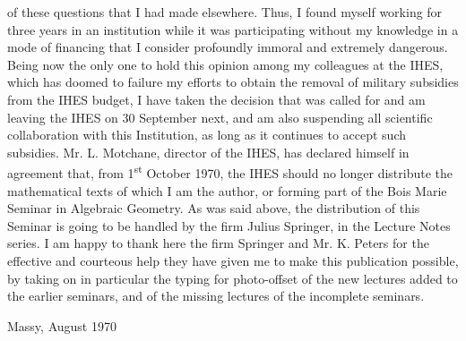of these questions that I had made elsewhere. Thus, I found myself working for three years in an institution while it was participating without my knowledge in a mode of financing that I consider profoundly immoral and extremely dangerous. Being now the only one to hold this opinion among my colleagues at the IHES, which has doomed to failure my efforts to obtain the removal of military subsidies from the IHES budget, I have taken the decision that was called for and am leaving the IHES on 30 September next, and am also suspending all scientific collaboration with this Institution, as long as it continues to accept such subsidies. Mr. L. Motchane, director of the IHES, has declared himself in agreement that, from 1\textsuperscript{st} October 1970, the IHES should no longer distribute the mathematical texts of which I am the author, or forming part of the Bois Marie Seminar in Algebraic Geometry. As was said above, the distribution of this Seminar is going to be handled by the firm Julius Springer, in the Lecture Notes series. I am happy to thank here the firm Springer and Mr. K. Peters for the effective and courteous help they have given me to make this publication possible, by taking on in particular the typing for photo-offset of the new lectures added to the earlier seminars, and of the missing lectures of the incomplete seminars.

\begin{flushright}
Massy, August 1970\\
\end{flushright}
